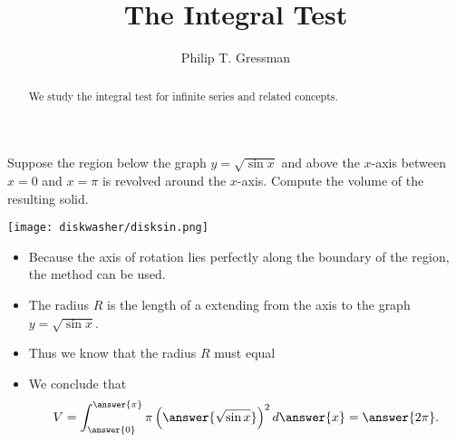 \documentclass{ximera}
\title{The Integral Test}
\author{Philip T. Gressman}
\begin{document}
\begin{abstract}
  We study the integral test for infinite series and related concepts.
\end{abstract}
\maketitle

\begin{example}
Suppose the region below the graph $y = \sqrt{\sin x}$ and above the $x$-axis between $x=0$ and $x=\pi$ is revolved around the $x$-axis. Compute the volume of the resulting solid.
\begin{center}
\begin{image}
\texttt{[image: diskwasher/disksin.png]}
\end{image}
\end{center}
\begin{itemize}
\item Because the axis of rotation lies perfectly along the boundary of the region, the  method can be used.
\item The radius $R$ is the length of a  extending from the axis to the graph $y = \sqrt{\sin x}$.
\item Thus we know that the radius $R$ must equal
\begin{multipleChoice}\end{multipleChoice}
\item We conclude that
\[ V = \int_{\answer{0}}^{\answer{\pi}} \pi \left( \answer{\sqrt{\sin x}} \right)^2 d\answer{x} = \answer{2\pi}. \]
\end{itemize}
\end{example}
\end{document}
